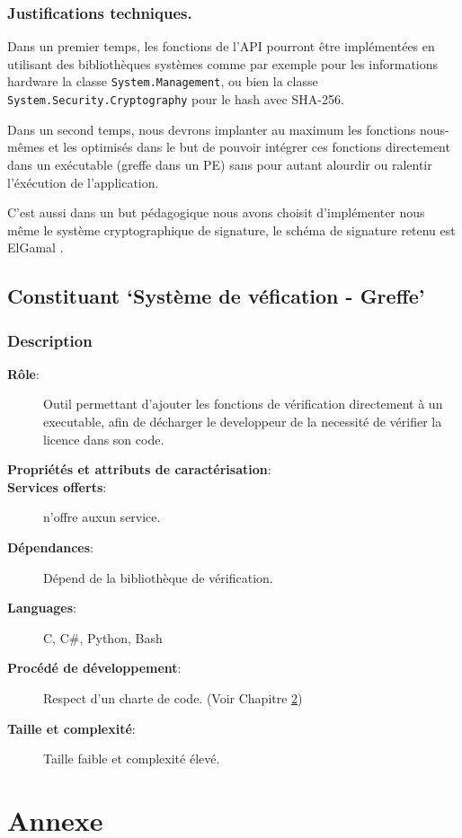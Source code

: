 \subsection{Justifications techniques.}
Dans un premier temps, les fonctions de l'API pourront être implémentées en utilisant des bibliothèques systèmes comme par exemple pour les informations hardware la 
classe \verb:System.Management:, ou bien la classe \verb:System.Security.Cryptography: 
pour le hash avec SHA-256.\newline

Dans un second temps, nous devrons implanter au maximum les fonctions nous-mêmes et 
les optimisés dans le but de pouvoir intégrer ces fonctions directement dans un 
exécutable (greffe dans un PE) sans pour autant alourdir ou ralentir l'éxécution de 
l'application. \newline

C'est aussi dans un but pédagogique nous avons choisit d'implémenter nous même le système cryptographique de signature, le schéma de signature retenu est ElGamal \cite{ElGamal}.

\section{Constituant `Système de véfication - Greffe'}
\subsection{Description}
\begin{description}
	\item[\textbf{Rôle}:]
			Outil permettant d'ajouter les fonctions de vérification directement à un
			executable, afin de décharger le developpeur de la necessité de vérifier 
			la licence dans son code.
	\item[\textbf{Propriétés et attributs de caractérisation}:]
	\item[\textbf{Services offerts}:]
		n'offre auxun service.
	\item[\textbf{Dépendances}:]
		Dépend de la bibliothèque de vérification.
	\item[\textbf{Languages}:]
		C, C\#, Python, Bash 
	\item[\textbf{Procédé de développement}:]
		Respect d'un charte de code. (Voir Chapitre \ref{chap:Annexe}) 
	\item[\textbf{Taille et complexité}:]
		Taille faible et complexité élevé.
\end{description}


\chapter{Annexe}
\label{chap:Annexe}


